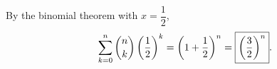 By the binomial theorem with $x=\dfrac12$,
\[\sum_{k=0}^{n}\dbinom nk\left(\dfrac12\right)^k=\left(1+\dfrac12\right)^n=\boxed{\left(\dfrac32\right)^n}.\]
